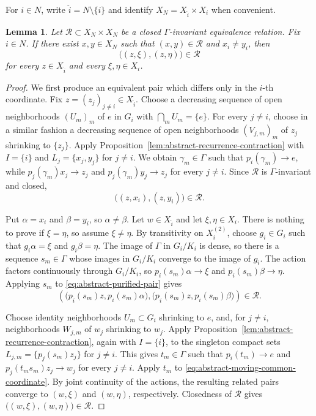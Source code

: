 \documentclass[11pt]{amsart}
\numberwithin{equation}{section}
\newtheorem{lemma}[theorem]{Lemma}
\theoremstyle{definition}
\begin{document}
	For $i\in N$, write $\widehat i=N\setminus\{i\}$ and identify
	$X_N=X_{\widehat i}\times X_i$ when convenient.
	
	\begin{lemma}
		\label{lem:abstract-one-coordinate-saturation}
		Let $\mathcal R\subset X_N\times X_N$ be a closed $\Gamma$-invariant equivalence
		relation.  Fix $i\in N$.  If there exist $x,y\in X_N$ such that
		$(x,y)\in\mathcal R$ and $x_i\neq y_i$, then
		\[
		\bigl((z,\xi),(z,\eta)\bigr)\in\mathcal R
		\]
		for every $z\in X_{\widehat i}$ and every $\xi,\eta\in X_i$.
	\end{lemma}
	
	\begin{proof}
		We first produce an equivalent pair which differs only in the $i$-th
		coordinate.  Fix $z=(z_j)_{j\neq i}\in X_{\widehat i}$.  Choose a decreasing sequence of open neighborhoods $(U_m)_m$ of $e$ in $G_i$ with $\bigcap_m U_m = \{e\}$. For every $j\neq i$, choose in a similar fashion a decreasing sequence of open neighborhoods $(V_{j,m})_m$ of $z_j$ shrinking to $\{z_j\}$.  Apply
		Proposition~\ref{lem:abstract-recurrence-contraction} with $I=\{i\}$ and
		$L_j=\{x_j,y_j\}$ for $j\neq i$. We obtain $\gamma_m\in\Gamma$ such that
		$p_i(\gamma_m)\to e$, while $p_j(\gamma_m)x_j\to z_j$ and
		$p_j(\gamma_m)y_j\to z_j$ for every $j\neq i$.
		Since $\mathcal R$ is $\Gamma$-invariant and closed,
		\begin{equation}
			\label{eq:abstract-purified-pair}
			\bigl((z,x_i),(z,y_i)\bigr)\in\mathcal R.
		\end{equation}
		
		Put $\alpha=x_i$ and $\beta=y_i$, so $\alpha\neq\beta$.  Let
		$w\in X_{\widehat i}$ and let $\xi,\eta\in X_i$.  There is nothing to prove if
		$\xi=\eta$, so assume $\xi\neq\eta$. By transitivity on $X_i^{(2)}$, choose
		$g_i\in G_i$ such that $g_i\alpha=\xi$ and $g_i\beta=\eta$.
		The image of $\Gamma$ in $G_i/K_i$ is dense, so there is a sequence
		$s_m\in\Gamma$ whose images in $G_i/K_i$ converge to the image of $g_i$.
		The action factors continuously through $G_i/K_i$, so
		$p_i(s_m)\alpha\to\xi$ and $p_i(s_m)\beta\to\eta$.
		Applying $s_m$ to \eqref{eq:abstract-purified-pair} gives
		\begin{equation}
			\label{eq:abstract-moving-common-coordinate}
			\left(
			\bigl(p_{\widehat i}(s_m)z,p_i(s_m)\alpha\bigr),
			\bigl(p_{\widehat i}(s_m)z,p_i(s_m)\beta\bigr)
			\right)\in\mathcal R.
		\end{equation}
		
		Choose identity neighborhoods $U_m\subset G_i$ shrinking to $e$, and, for
		$j\neq i$, neighborhoods $W_{j,m}$ of $w_j$ shrinking to $w_j$.  Apply
		Proposition~\ref{lem:abstract-recurrence-contraction}, again with $I=\{i\}$,
		to the singleton compact sets $L_{j,m}=\{p_j(s_m)z_j\}$ for $j\neq i$. This
		gives $t_m\in\Gamma$ such that $p_i(t_m)\to e$ and
		$p_j(t_ms_m)z_j\to w_j$ for every $j\neq i$.
		Apply $t_m$ to \eqref{eq:abstract-moving-common-coordinate}.  By joint
		continuity of the actions, the resulting related pairs converge to
		$(w,\xi)$ and $(w,\eta)$, respectively.  Closedness of $\mathcal R$ gives
		$\bigl((w,\xi),(w,\eta)\bigr)\in\mathcal R$.
	\end{proof}
	
\end{document}
